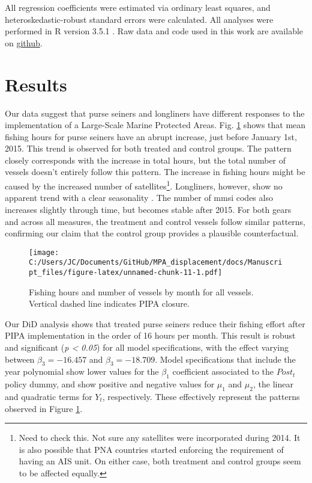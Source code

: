 \documentclass[11pt,]{article}
\let\rmarkdownfootnote\footnote%
\def\footnote{\protect\rmarkdownfootnote}
\begin{document}
All regression coefficients were estimated via ordinary least squares,
and heteroskedastic-robust standard errors were calculated. All analyses
were performed in R version 3.5.1 \citep{rcore_2018}. Raw data and code
used in this work are available on
\href{https://github.com/jcvdav/MPA_displacement}{github}.

\clearpage

\hypertarget{results}{%
\section{Results}\label{results}}

Our data suggest that purse seiners and longliners have different
responses to the implementation of a Large-Scale Marine Protected Areas.
Fig. \ref{fig:all_vessels} shows that mean fishing hours for purse
seiners have an abrupt increase, just before January 1st, 2015. This
trend is observed for both treated and control groups. The pattern
closely corresponds with the increase in total hours, but the total
number of vessels doesn't entirely follow this pattern. The increase in
fishing hours might be caused by the increased number of
satellites\footnote{Need to check this. Not sure any satellites were
  incorporated during 2014. It is also possible that PNA countries
  started enforcing the requirement of having an AIS unit. On either
  case, both treatment and control groups seem to be affected equally.}.
Longliners, however, show no apparent trend with a clear seasonality
\citep{ortuocrespo_2018}. The number of mmsi codes also increases
slightly through time, but becomes stable after 2015. For both gears and
across all measures, the treatment and control vessels follow similar
patterns, confirming our claim that the control group provides a
plausible counterfactual.

\begin{figure}
\centering
\texttt{[image: C:/Users/JC/Documents/GitHub/MPA\_displacement/docs/Manuscript\_files/figure-latex/unnamed-chunk-11-1.pdf]}
\caption{\label{fig:unnamed-chunk-11}\label{fig:all_vessels}Fishing hours
and number of vessels by month for all vessels. Vertical dashed line
indicates PIPA closure.}
\end{figure}

Our DiD analysis shows that treated purse seiners reduce their fishing
effort after PIPA implementation in the order of 16 hours per month.
This result is robust and significant (\emph{p \textless{} 0.05}) for
all model specifications, with the effect varying between
\(\beta_3 = -16.457\) and \(\beta_3 = -18.709\). Model specifications
that include the year polynomial show lower values for the \(\beta_1\)
coefficient associated to the \(Post_t\) policy dummy, and show positive
and negative values for \(\mu_1\) and \(\mu_2\), the linear and
quadratic terms for \(Y_t\), respectively. These effectively represent
the patterns observed in Figure \ref{fig:all_vessels}.
\end{document}
